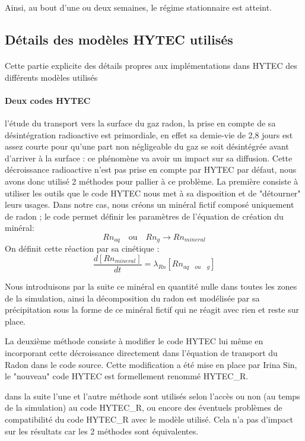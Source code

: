 \documentclass{article}
\begin{document}
Ainsi, au bout d'une ou deux semaines, le régime stationnaire est atteint.

\subsection{Détails des modèles HYTEC utilisés}
\label{annexe:detail_modele_radon}
\paragraph{}Cette partie explicite des détails propres aux implémentations dans HYTEC des différents modèles utilisés

\paragraph{Deux codes HYTEC}l'étude du transport vers la surface du gaz radon, la prise en compte de sa désintégration radioactive est primordiale, en effet sa demie-vie de 2,8 jours est assez courte pour qu'une part non négligeable du gaz se soit désintégrée  avant d'arriver à la surface : ce phénomène va avoir un impact sur sa diffusion. Cette décroissance radioactive n'est pas prise en compte par HYTEC par défaut, nous avons donc utilisé 2 méthodes pour pallier à ce problème.
La première consiste à utiliser les outils que le code HYTEC nous met à sa disposition et de "détourner" leurs usages. Dans notre cas, nous créons un minéral fictif composé uniquement de radon ; le code permet définir les paramètres de l'équation de création du minéral: 
$$Rn_{aq} \quad \text{ou} \quad Rn_{g} \rightarrow Rn_{mineral}$$
On définit cette réaction par sa cinétique : 
$$ \frac{d\left[ Rn_{mineral} \right]}{dt}=\lambda_{Rn} \left[ Rn_{aq \quad ou \quad g} \right] $$

Nous introduisons par la suite ce minéral en quantité nulle dans toutes les zones de la simulation, ainsi la décomposition du radon est modélisée par sa précipitation sous la forme de ce minéral fictif qui ne réagit avec rien et reste sur place.

La deuxième méthode consiste à modifier le code HYTEC lui même en incorporant cette décroissance directement dans l'équation de transport du Radon dans le code source. Cette modification a été mise en place par Irina Sin, le "nouveau" code HYTEC est formellement renommé HYTEC\_R.

dans la suite l'une et l'autre méthode sont utilisés selon l'accès ou non (au temps de la simulation) au code HYTEC\_R, ou encore des éventuels problèmes de compatibilité du code HYTEC\_R avec le modèle utilisé. Cela n'a pas d'impact sur les résultats car les 2 méthodes sont équivalentes.
\end{document}

